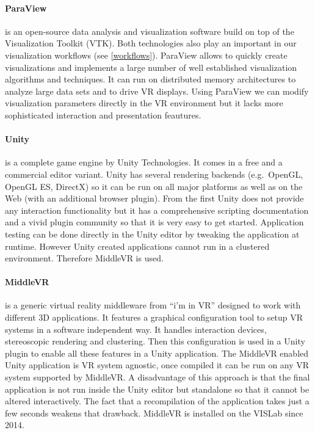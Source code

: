 \paragraph{ParaView}\cite{paraview}
is an open-source data analysis and visualization software build on top of the
Visualization Toolkit\cite{vtk} (VTK). Both technologies also play an important in
our visualization workflows (see \ref{workflows}). ParaView allows to quickly
create visualizations and implements a large number of well established
visualization algorithms and techniques. It can run on distributed memory
architectures to analyze large data sets and to drive VR displays. Using
ParaView we can modify visualization parameters directly in the VR environment
but it lacks more sophisticated interaction and presentation feautures.

\paragraph{Unity}
is a complete game engine by Unity Technologies. It comes in a free and
a commercial editor variant. Unity has several rendering backends
(e.g.~OpenGL, OpenGL ES, DirectX) so it can be run on all major
platforms as well as on the Web (with an additional browser plugin).
From the first Unity does not provide any interaction functionality but
it has a comprehensive scripting documentation and a vivid plugin
community so that it is very easy to get started. Application testing
can be done directly in the Unity editor by tweaking the application at
runtime. However Unity created applications cannot run in a clustered
environment. Therefore MiddleVR is used.

\paragraph{MiddleVR}
is a generic virtual reality middleware from ``i'm in VR'' designed to
work with different 3D applications. It features a graphical
configuration tool to setup VR systems in a software independent way. It
handles interaction devices, stereoscopic rendering and clustering. Then
this configuration is used in a Unity plugin to enable all these
features in a Unity application. The MiddleVR enabled Unity application
is VR system agnostic, once compiled it can be run on any VR system
supported by MiddleVR. A disadvantage of this approach is that the final
application is not run inside the Unity editor but standalone so that it
cannot be altered interactively. The fact that a recompilation of the
application takes just a few seconds weakens that drawback. MiddleVR is
installed on the VISLab since 2014.

